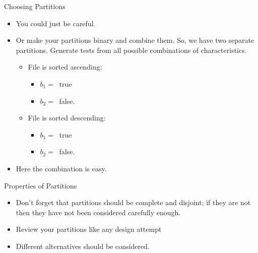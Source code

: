 \documentclass{beamer}
\begin{document}
\begin{frame}{Choosing Partitions}

  \begin{itemize}
  \item You could just be careful.
  \item Or make your partitions binary and combine them. So, we have two
    separate partitions. Generate tests from all possible combinations of
    characteristics. 
    \begin{itemize}
    \item File is sorted ascending:
      \begin{itemize}
      \item $b_1 = \ $ true
      \item $b_2 = \ $ false.
      \end{itemize}
    \item File is sorted descending:
      \begin{itemize}
      \item $b_1 = \ $ true
      \item $b_2 = \ $ false.
      \end{itemize}
    \end{itemize}
    \item Here the combination  is easy. 
  \end{itemize} 
\end{frame}
\begin{frame}{Properties of Partitions}
  \begin{itemize}
  \item Don't forget that partitions should be complete and disjoint;
    if they are not then they have not been considered carefully
    enough.
    \item Review your partitions like any design attempt
    \item Different alternatives should be considered.
  \end{itemize}
\end{frame}
\end{document}
